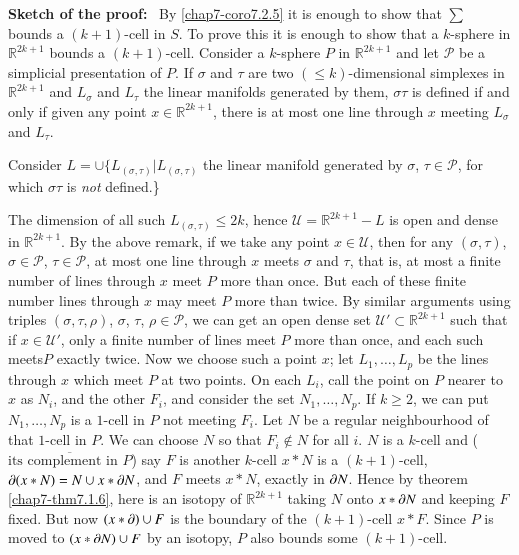 \noindent
{\bf Sketch of the proof:}~ By \ref{chap7-coro7.2.5} it is enough to show that $\sum$ bounds a $(k+1)$-cell in $S$. To prove this it is enough to show that a $k$-sphere in $\mathbb{R}^{2k+1}$ bounds a $(k+1)$-cell. Consider a $k$-sphere $P$ in $\mathbb{R}^{2k+1}$ and let $\mathscr{P}$ be a simplicial presentation of $P$. If $\sigma$ and $\tau$ are two $(\leq k)$-dimensional simplexes in $\mathbb{R}^{2k+1}$ and $L_{\sigma}$ and $L_{\tau}$ the linear manifolds generated by them, $\sigma\tau$ is defined if and only if given any point $x\in \mathbb{R}^{2k+1}$, there is at most one line through $x$ meeting $L_{\sigma}$ and $L_{\tau}$.

Consider $L=\cup\{L_{(\sigma,\tau)}|L_{(\sigma,\tau)}$ the linear manifold generated by $\sigma$, $\tau\in \mathscr{P}$, for which $\sigma\tau$ is {\em not} defined.\} 

The dimension of all such $L_{(\sigma,\tau)}\leq 2k$, hence $\mathscr{U}=\mathbb{R}^{2k+1}-L$ is open and dense in $\mathbb{R}^{2k+1}$. By the above remark, if we take any point $x\in \mathscr{U}$, then for any $(\sigma,\tau)$, $\sigma\in\mathscr{P}$, $\tau\in\mathscr{P}$, at most one line through $x$ meets $\sigma$ and $\tau$, that is, at most a finite number of lines through $x$ meet $P$ more than once. But each of these finite number lines through $x$ may meet $P$ more than twice. By similar arguments using triples $(\sigma,\tau,\rho)$, $\sigma$, $\tau$, $\rho\in\mathscr{P}$, we can get an open dense set $\mathscr{U}'\subset \mathbb{R}^{2k+1}$ such that if $x\in\mathscr{U}'$, only a finite number of lines meet $P$ more than once, and each such meets\pageoriginale $P$ exactly twice. Now we choose such a point $x$; let $L_{1},\ldots,L_{p}$ be the lines through $x$ which meet $P$ at two points. On each $L_{i}$, call the point on $P$ nearer to $x$ as $N_{i}$, and the other $F_{i}$, and consider the set $N_{1},\ldots,N_{p}$. If $k\geq 2$, we can put $N_{1},\ldots,N_{p}$ is a $1$-cell in $P$ not meeting $F_{i}$. Let $N$ be a regular neighbourhood of that $1$-cell in $P$. We can choose $N$ so that $F_{i}\not\in N$ for all $i$. $N$ is a $k$-cell and ($\overline{\text{its complement in $P$}}$) say $F$ is another $k$-cell $x\ast N$ is a $(k+1)$-cell, $\partial (x\ast N)=N\cup x\ast\partial N$, and $F$ meets $x\ast N$, exactly in $\partial N$. Hence by theorem \ref{chap7-thm7.1.6}, here is an isotopy of $\mathbb{R}^{2k+1}$ taking $N$ onto $x\ast \partial N$ and keeping $F$ fixed. But now $(x\ast\partial)\cup F$ is the boundary of the $(k+1)$-cell $x\ast F$. Since $P$ is moved to $(x\ast \partial N)\cup F$ by an isotopy, $P$ also bounds some $(k+1)$-cell.

